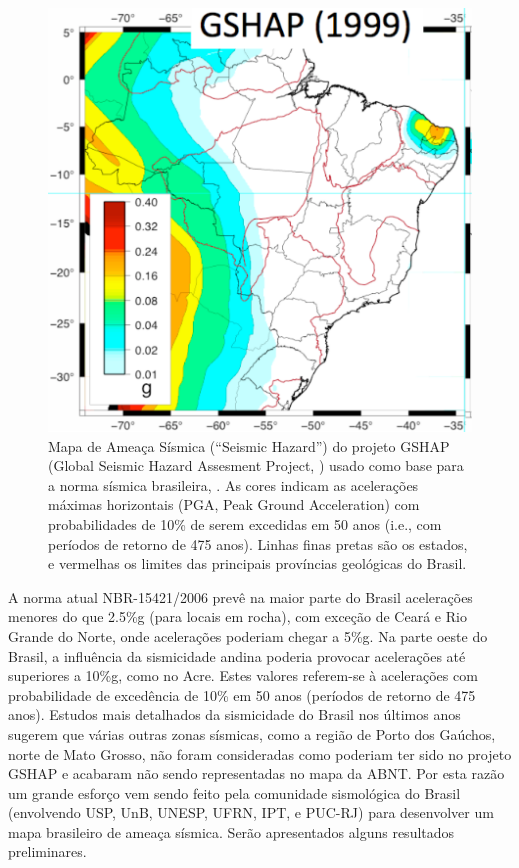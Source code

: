 \documentclass[jgrga]{agutex}
\begin{document}
\begin{article}
\begin{figure}[H]
	\centerline{\includegraphics[width=\hsize]{img_gshap}}
	\caption{Mapa de Ameaça Sísmica (``Seismic Hazard'') do projeto GSHAP (Global Seismic Hazard Assesment Project, \citet{shedlock_tanner_1999}) usado como base para a norma sísmica brasileira, \citet{nbr_15421_2006}. As cores indicam as acelerações máximas horizontais (PGA, Peak Ground Acceleration) com probabilidades de 10\% de serem excedidas em 50 anos (i.e., com períodos de retorno de 475 anos). Linhas finas pretas são os estados, e vermelhas os limites das principais províncias geológicas do Brasil.}
	\label{fig_gshap2}
\end{figure}

A norma atual NBR-15421/2006 prevê na maior parte do Brasil acelerações menores do que 2.5\%g (para locais em rocha), com exceção de Ceará e Rio Grande do Norte, onde acelerações poderiam chegar a 5\%g.  Na parte oeste do Brasil, a influência da sismicidade andina poderia provocar acelerações até superiores a 10\%g, como no Acre. Estes valores referem-se à acelerações com probabilidade de excedência de 10\% em 50 anos (períodos de retorno de 475 anos).  Estudos mais detalhados da sismicidade do Brasil nos últimos anos sugerem que várias outras zonas sísmicas, como a região de Porto dos Gaúchos, norte de Mato Grosso, não foram consideradas como poderiam ter sido no projeto GSHAP e acabaram não sendo representadas no mapa da ABNT. Por esta razão um grande esforço vem sendo feito pela comunidade sismológica do Brasil (envolvendo USP, UnB, UNESP, UFRN, IPT, e PUC-RJ) para desenvolver um mapa brasileiro de ameaça sísmica. Serão apresentados alguns resultados preliminares.



\end{article}
\end{document}
